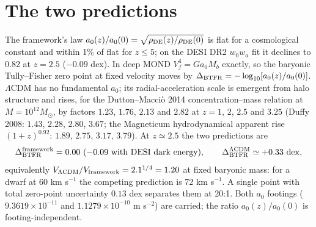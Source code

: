 \documentclass[11pt,letterpaper]{article}
\begin{document}
\section{The two predictions}
The framework's law $a_0(z)/a_0(0)=\sqrt{\rho_{\rm DE}(z)/\rho_{\rm DE}(0)}$ is flat for a cosmological constant and within 1\% of flat for $z\le5$; on the DESI DR2 $w_0w_a$ fit it declines to $0.82$ at $z=2.5$ ($-0.09$ dex). In deep MOND $V_f^4=Ga_0M_b$ exactly, so the baryonic Tully--Fisher zero point at fixed velocity moves by $\Delta_{\rm BTFR}=-\log_{10}[a_0(z)/a_0(0)]$. $\Lambda$CDM has no fundamental $a_0$; its radial-acceleration scale is emergent from halo structure and rises, for the Dutton--Macci\`o 2014 concentration--mass relation at $M=10^{12}M_\odot$, by factors $1.23$, $1.76$, $2.13$ and $2.82$ at $z=1$, $2$, $2.5$ and $3.25$ (Duffy 2008: $1.43$, $2.28$, $2.80$, $3.67$; the Magneticum hydrodynamical apparent rise $(1+z)^{0.92}$: $1.89$, $2.75$, $3.17$, $3.79$). At $z\simeq2.5$ the two predictions are
\begin{equation}
\Delta_{\rm BTFR}^{\rm framework}=0.00\ (\text{$-0.09$ with DESI dark energy}),\qquad \Delta_{\rm BTFR}^{\Lambda{\rm CDM}}\simeq+0.33\ {\rm dex},
\end{equation}
equivalently $V_{\Lambda{\rm CDM}}/V_{\rm framework}=2.1^{1/4}=1.20$ at fixed baryonic mass: for a dwarf at 60 km s$^{-1}$ the competing prediction is 72 km s$^{-1}$. A single point with total zero-point uncertainty $0.13$ dex separates them at 20:1. Both $a_0$ footings ($9.3619\times10^{-11}$ and $1.1279\times10^{-10}$ m s$^{-2}$) are carried; the ratio $a_0(z)/a_0(0)$ is footing-independent.
\end{document}
